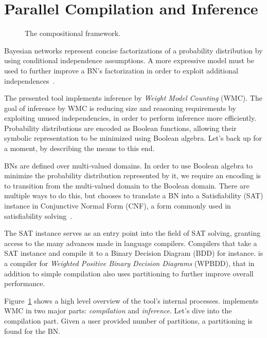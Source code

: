 

\section{Parallel Compilation and Inference}
\label{secjjparallel}

\begin{figure}[!t]
    \centering
    \scalebox{0.6}{
        
    }
    \caption{The compositional framework.}
    \label{fig:frameworkoverview}
\end{figure}

Bayesian networks represent concise factorizations of a probability distribution by using conditional independence assumptions. A more expressive model must be used to further improve a BN's factorization in order to exploit additional independences~\cite{zhang1996exploiting,boutilier1996context,friedman1998learning}.  

The presented tool implements inference by \emph{Weight Model Counting} (WMC). The goal of inference by WMC is reducing size and reasoning requirements by exploiting unused independencies, in order to perform inference more efficiently. Probability distributions are encoded as Boolean functions, allowing their symbolic representation to be minimized using Boolean algebra. Let's back up for a moment, by describing the means to this end. 

BNs are defined over multi-valued domains. In order to use Boolean algebra to minimize the probability distribution represented by it, we require an encoding is to transition from the multi-valued domain to the Boolean domain. There are multiple ways to do this, but \toolname chooses to translate a BN into a Satisfiability (SAT) instance in Conjunctive Normal Form (CNF), a form commonly used in satisfiability solving~\cite{dal2017wpbdd}. 

The SAT instance serves as an entry point into the field of SAT solving, granting access to the many advances made in language compilers. Compilers that take a SAT instance and compile it to a Binary Decision Diagram (BDD) for instance. \toolname is a compiler for \emph{Weighted Positive Binary Decision Diagrams} (WPBDD), that in addition to simple compilation also uses partitioning to further improve overall performance.

Figure~\ref{fig:frameworkoverview} shows a high level overview of the tool's internal processes. \toolname implements WMC in two major parts: \emph{compilation} and \emph{inference}. Let's dive into the compilation part. Given a user provided number of partitions, a partitioning is found for the BN. 


